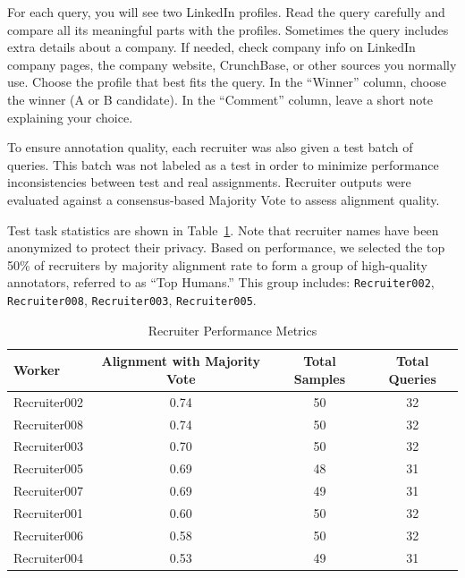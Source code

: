\documentclass{article}
\begin{document}
\begin{tcolorbox}[colback=gray!10, colframe=gray!80, title=Instruction given to each expert]
For each query, you will see two LinkedIn profiles. Read the query carefully and compare all its meaningful parts with the profiles. Sometimes the query includes extra details about a company. If needed, check company info on LinkedIn company pages, the company website, CrunchBase, or other sources you normally use. Choose the profile that best fits the query. In the ``Winner'' column, choose the winner (A or B candidate). In the ``Comment'' column, leave a short note explaining your choice.
\end{tcolorbox}
 

To ensure annotation quality, each recruiter was also given a test batch of queries. This batch was not labeled as a test in order to minimize performance inconsistencies between test and real assignments. Recruiter outputs were evaluated against a consensus-based Majority Vote to assess alignment quality. 

Test task statistics are shown in Table~\ref{tab:test_stats}. Note that recruiter names have been anonymized to protect their privacy. Based on performance, we selected the top 50\% of recruiters by majority alignment rate to form a group of high-quality annotators, referred to as ``Top Humans.'' This group includes: \texttt{Recruiter002}, \texttt{Recruiter008}, \texttt{Recruiter003}, \texttt{Recruiter005}.
 

\begin{table}[ht]
\centering
\begin{tabular}{lccc}
\hline
\textbf{Worker} & \textbf{Alignment with Majority Vote} & \textbf{Total Samples} & \textbf{Total Queries} \\
\hline
Recruiter002 & 0.74 & 50 & 32 \\
Recruiter008 & 0.74 & 50 & 32 \\
Recruiter003 & 0.70 & 50 & 32 \\
Recruiter005 & 0.69 & 48 & 31 \\
Recruiter007 & 0.69 & 49 & 31 \\
Recruiter001 & 0.60 & 50 & 32 \\
Recruiter006 & 0.58 & 50 & 32 \\
Recruiter004 & 0.53 & 49 & 31 \\
\hline
\end{tabular}
\caption{Recruiter Performance Metrics}
\label{tab:test_stats}
\end{table}
\end{document}
